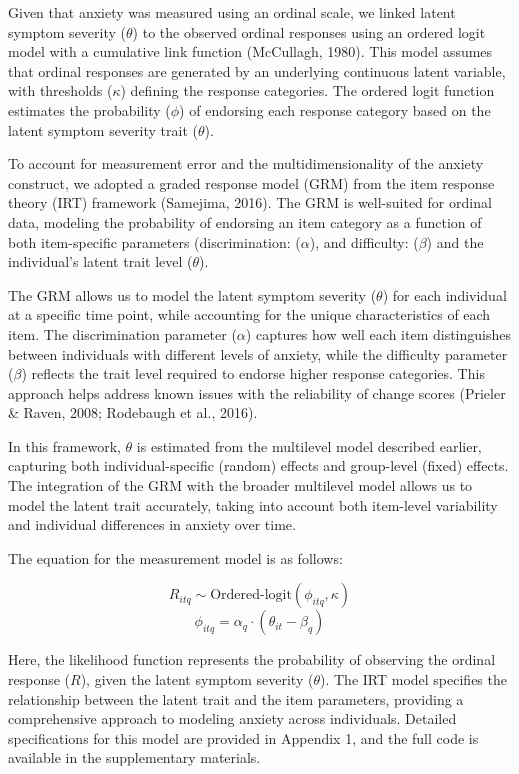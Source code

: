 \documentclass[
  man,floatsintext]{apa7}
\begin{document}
Given that anxiety was measured using an ordinal scale, we linked latent symptom severity (\(\theta\)) to the observed ordinal responses using an ordered logit model with a cumulative link function (McCullagh, 1980).
This model assumes that ordinal responses are generated by an underlying continuous latent variable, with thresholds (\(\kappa\)) defining the response categories.
The ordered logit function estimates the probability (\(\phi\)) of endorsing each response category based on the latent symptom severity trait (\(\theta\)).

To account for measurement error and the multidimensionality of the anxiety construct, we adopted a graded response model (GRM) from the item response theory (IRT) framework (Samejima, 2016).
The GRM is well-suited for ordinal data, modeling the probability of endorsing an item category as a function of both item-specific parameters (discrimination: (\(\alpha\)), and difficulty: (\(\beta\)) and the individual's latent trait level (\(\theta\)).

The GRM allows us to model the latent symptom severity (\(\theta\)) for each individual at a specific time point, while accounting for the unique characteristics of each item.
The discrimination parameter (\(\alpha\)) captures how well each item distinguishes between individuals with different levels of anxiety, while the difficulty parameter (\(\beta\)) reflects the trait level required to endorse higher response categories.
This approach helps address known issues with the reliability of change scores (Prieler \& Raven, 2008; Rodebaugh et al., 2016).

In this framework, \(\theta\) is estimated from the multilevel model described earlier, capturing both individual-specific (random) effects and group-level (fixed) effects.
The integration of the GRM with the broader multilevel model allows us to model the latent trait accurately, taking into account both item-level variability and individual differences in anxiety over time.

The equation for the measurement model is as follows:

\[R_{itq} \sim \text{Ordered-logit}(\phi_{itq}, \kappa)\]
\[\phi_{itq} = \alpha_q \cdot (\theta_{it} - \beta_q)\]

Here, the likelihood function represents the probability of observing the ordinal response (\(R\)), given the latent symptom severity (\(\theta\)).
The IRT model specifies the relationship between the latent trait and the item parameters, providing a comprehensive approach to modeling anxiety across individuals.
Detailed specifications for this model are provided in Appendix 1, and the full code is available in the supplementary materials.
\end{document}
